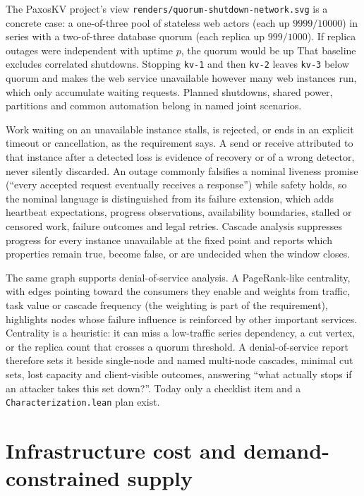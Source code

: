 The PaxosKV project's view \texttt{renders/quorum-shutdown-network.svg} is a
concrete case: a one-of-three pool of stateless web actors (each up
$9999/10000$) in series with a two-of-three database quorum (each replica up
$999/1000$). If replica outages were independent with uptime $p$, the quorum
would be up
That baseline excludes correlated shutdowns. Stopping \texttt{kv-1} and then
\texttt{kv-2} leaves \texttt{kv-3} below quorum and makes the web service
unavailable however many web instances run, which only accumulate waiting
requests. Planned shutdowns, shared power, partitions and common automation belong
in named joint scenarios.

Work waiting on an unavailable instance stalls, is rejected, or ends in an
explicit timeout or cancellation, as the requirement says. A send or receive
attributed to that instance after a detected loss is evidence of recovery or of a
wrong detector, never silently discarded. An outage commonly falsifies a nominal
liveness promise (``every accepted request eventually receives a response'') while
safety holds, so the nominal language is distinguished from its failure extension,
which adds heartbeat expectations, progress observations, availability boundaries,
stalled or censored work, failure outcomes and legal retries. Cascade analysis
suppresses progress for every instance unavailable at the fixed point and reports
which properties remain true, become false, or are undecided when the window
closes.

The same graph supports denial-of-service analysis. A PageRank-like centrality,
with edges pointing toward the consumers they enable and weights from traffic,
task value or cascade frequency (the weighting is part of the requirement),
highlights nodes whose failure influence is reinforced by other important
services. Centrality is a heuristic: it can miss a low-traffic series dependency,
a cut vertex, or the replica count that crosses a quorum threshold. A
denial-of-service report therefore sets it beside single-node and named multi-node
cascades, minimal cut sets, lost capacity and client-visible outcomes, answering
``what actually stops if an attacker takes this set down?''. Today only a
checklist item and a \texttt{Characterization.lean} plan exist.

\section{Infrastructure cost and demand-constrained supply}

